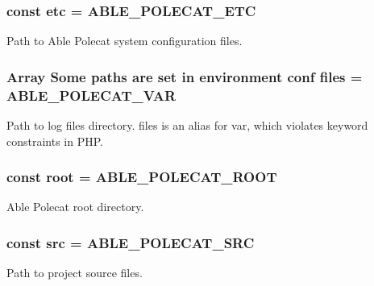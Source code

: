 \subsubsection[{etc}]{\setlength{\rightskip}{0pt plus 5cm}const etc = A\+B\+L\+E\+\_\+\+P\+O\+L\+E\+C\+A\+T\+\_\+\+E\+T\+C}\label{class_able_polecat___server___paths_a538dc0c3e85b782afe19d00972981ef1}
Path to Able Polecat system configuration files. \hypertarget{class_able_polecat___server___paths_a3a2c34aec74f007b4cbfd50aa9b57a79}{}
\subsubsection[{files}]{\setlength{\rightskip}{0pt plus 5cm}Array Some paths are set in environment conf files = A\+B\+L\+E\+\_\+\+P\+O\+L\+E\+C\+A\+T\+\_\+\+V\+A\+R}\label{class_able_polecat___server___paths_a3a2c34aec74f007b4cbfd50aa9b57a79}
Path to log files directory. \textquotesingle{}files\textquotesingle{} is an alias for \textquotesingle{}var\textquotesingle{}, which violates keyword constraints in P\+H\+P. \hypertarget{class_able_polecat___server___paths_a7f9af059d5709ec492c54f245cb1da99}{}
\subsubsection[{root}]{\setlength{\rightskip}{0pt plus 5cm}const root = A\+B\+L\+E\+\_\+\+P\+O\+L\+E\+C\+A\+T\+\_\+\+R\+O\+O\+T}\label{class_able_polecat___server___paths_a7f9af059d5709ec492c54f245cb1da99}
Able Polecat root directory. \hypertarget{class_able_polecat___server___paths_ac4665644ebe481a55adb1b2ddbccb1d4}{}
\subsubsection[{src}]{\setlength{\rightskip}{0pt plus 5cm}const src = A\+B\+L\+E\+\_\+\+P\+O\+L\+E\+C\+A\+T\+\_\+\+S\+R\+C}\label{class_able_polecat___server___paths_ac4665644ebe481a55adb1b2ddbccb1d4}
Path to project source files. \hypertarget{class_able_polecat___server___paths_acc8c23568756f209aed591b949cba229}{}
